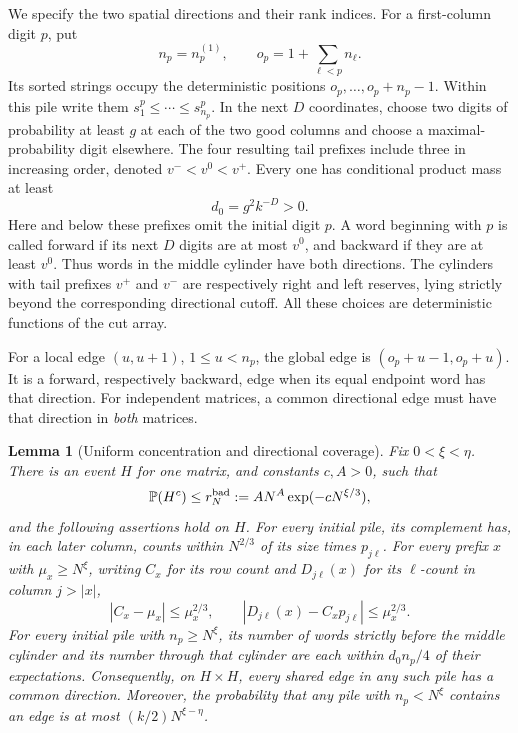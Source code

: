 \documentclass[11pt]{article}
\numberwithin{equation}{section}
\newtheorem{lemma}[lemma]{Lemma}
\newcommand{\Pp}{\mathbb P}
\newcommand{\1}{\mathbf 1}
\begin{document}
We specify the two spatial directions and their rank indices.
For a first-column digit \(p\), put
\[
 n_p=n^{(1)}_p,\qquad o_p=1+\sum_{\ell<p}n_\ell.
\]
Its sorted strings occupy the deterministic positions
\(o_p,\ldots,o_p+n_p-1\). Within this pile write them
\(s^p_1\le\cdots\le s^p_{n_p}\). In the next \(D\) coordinates,
choose two digits of probability at least \(g\) at each of the two
good columns and choose a maximal-probability digit elsewhere. The
four resulting tail prefixes include three in increasing order,
denoted \(v^-<v^0<v^+\). Every one has conditional product mass at
least
\begin{equation}
\label{eq:ub-reserve-mass}
 d_0=g^2 k^{-D}>0.
\end{equation}
Here and below these prefixes omit the initial digit \(p\).
A word beginning with \(p\) is called forward if its next \(D\)
digits are at most \(v^0\), and backward if they are at least
\(v^0\). Thus words in the middle cylinder have both directions.
The cylinders with tail prefixes \(v^+\) and \(v^-\) are respectively
right and left reserves, lying strictly beyond the corresponding
directional cutoff. All these choices are deterministic functions of
the cut array.

For a local edge \((u,u+1)\), \(1\le u<n_p\), the global edge is
\((o_p+u-1,o_p+u)\). It is a forward, respectively backward, edge
when its equal endpoint word has that direction. For independent
matrices, a common directional edge must have that direction in
\emph{both} matrices.

\begin{lemma}[Uniform concentration and directional coverage]
\label{lem:ub-exploration-concentration}
Fix \(0<\xi<\eta\). There is an event \(H\) for one matrix,
and constants \(c,A>0\), such that
\begin{equation}
\label{eq:ub-exploration-H-probability}
 \Pp(H^c)\le r_N^{\rm bad}:=A N^A\exp(-cN^{\xi/3}),
\end{equation}
and the following assertions hold on \(H\).
For every initial pile, its complement has, in each later column,
counts within \(N^{2/3}\) of its size times \(p_{j\ell}\).
For every prefix \(x\) with \(\mu_x\ge N^\xi\), writing \(C_x\)
for its row count and \(D_{j\ell}(x)\) for its \(\ell\)-count in
column \(j>|x|\),
\begin{equation}
\label{eq:ub-exploration-prefix-concentration}
 |C_x-\mu_x|\le\mu_x^{2/3},\qquad
 |D_{j\ell}(x)-C_xp_{j\ell}|\le\mu_x^{2/3}.
\end{equation}
For every initial pile with \(n_p\ge N^\xi\), its number of words
strictly before the middle cylinder and its number through that
cylinder are each within \(d_0 n_p/4\) of their expectations.
Consequently, on \(H\times H\), every shared edge in any such pile
has a common direction.
Moreover, the probability that any pile with \(n_p<N^\xi\) contains
an edge is at most \((k/2)N^{\xi-\eta}\).
\end{lemma}
\end{document}
